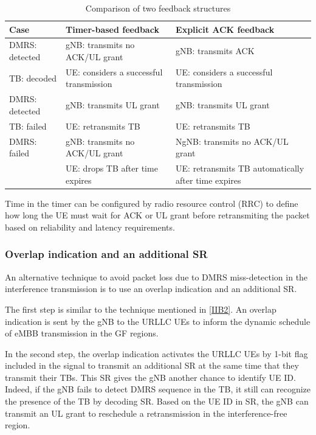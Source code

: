 \documentclass{ieeeaccess}
\begin{document}
\begin{table}[htbp]
\caption{Comparison of two feedback structures}
\begin{center}
\begin{tabular}{|p{8em}|p{8em}|p{8em}|}
 \hline
 \textbf{Case} & \textbf{Timer-based feedback}&\textbf{Explicit ACK feedback}\\
 \hline
 DMRS: detected&gNB: transmits no ACK/UL grant&gNB: transmits ACK\\TB: decoded &UE: considers a successful transmission &UE: considers a successful transmission\\
 \hline
  DMRS: detected&gNB: transmits UL grant &gNB: transmits UL grant\\TB: failed & UE: retransmits TB&UE: retransmits TB\\
 \hline
DMRS: failed&gNB: transmits no ACK/UL grant&NgNB: transmits no ACK/UL grant\\ &UE: drops TB after time expires& UE: retransmits TB automatically after time expires\\

 
 \hline
\end{tabular}
\label{tab1}
\end{center}

\end{table}

Time in the timer can be configured by radio resource control (RRC) to define how long the UE must wait for ACK or UL grant before retransmiting the packet based on reliability and latency requirements.

\subsubsection{Overlap indication and an additional SR}\label{IIB3}

An alternative technique to avoid packet loss due to DMRS miss-detection in the interference transmission is to use an overlap indication and an additional SR.

The first step is similar to the technique mentioned in \ref{IIB2}. An overlap indication is sent by the gNB to the URLLC UEs to inform the dynamic schedule of eMBB transmission in the GF regions.

In the second step, the overlap indication activates the URLLC UEs by 1-bit flag included in the signal to transmit an additional SR at the same time that they transmit their TBs. This SR gives the gNB another chance to identify UE ID. Indeed, if the gNB fails to detect DMRS sequence in the TB, it still can recognize the presence of the TB by decoding SR. Based on the UE ID in SR, the gNB can transmit an UL grant to reschedule a retransmission in the interference-free region.
\end{document}
